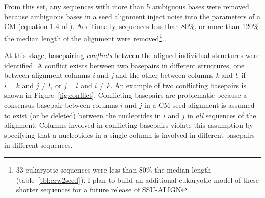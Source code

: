 From this set, any sequences with more than 5 ambiguous bases were
removed because ambiguous bases in a seed alignment inject noise into
the parameters of a CM (equation 1.4 of
\cite{Nawrocki09b}). Additionally, sequences less than 80\%, or more
than 120\% the median length of the alignment were removed\footnote{33
  eukaryotic sequences were less than 80\% the median length
  (table~\ref{tbl:crw2seed}). I plan to build an additional eukaryotic
  model of these shorter sequences for a future release of
  SSU-ALIGN}..

At this stage, basepairing \emph{conflicts} between the aligned
individual structures were identified. A conflict exists between two
basepairs in different structures, one between alignment columns
\emph{i} and \emph{j} and the other between columns \emph{k} and
\emph{l}, if $i = k$ and $j \neq l$, or $j = l$ and $i \neq k$.  An
example of two conflicting basepairs is shown in
Figure~\ref{fig:conflict}.  Conflicting basepairs are problematic
because a consensus basepair between columns $i$ and $j$ in a CM seed
alignment is assumed to exist (or be deleted) between the nucleotides in
$i$ and $j$ in \emph{all} sequences of the alignment. Columns involved
in conflicting basepairs violate this assumption by specifying that a
nucleotides in a single column is involved in different basepairs in
different sequences.


